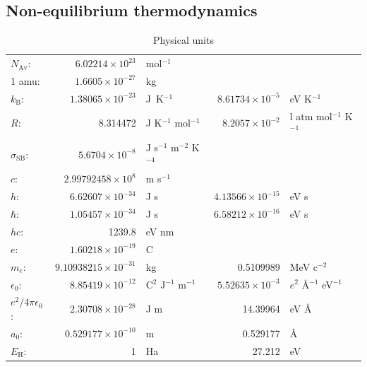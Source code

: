 \documentclass[11pt]{article}
\begin{document}
\subsection{Non-equilibrium thermodynamics}
\label{sec:org2658aed}
\begin{table}
\begin{center}
\caption{Physical units}
\begin{tabular}{|lrlrl|}
  \hline
  $N_\mathrm{Av}$: & $6.02214 \times 10^{23}$& mol$^{-1}$  & & \\
  1 amu: & $1.6605\times 10^{-27}$ & kg & & \\
  $k_\mathrm{B}$: & $1.38065\times 10^{-23}$ & J~K$^{-1}$ & $8.61734\times
  10^{-5}$ & eV K$^{-1}$\\
  $R$: & 8.314472 & J K$^{-1}$ mol$^{-1}$ & $8.2057 \times 10^{-2}$ & l atm mol$^{-1}$ K$^{-1}$\\
  $\sigma_\mathrm{SB}$: & $5.6704\times 10^{-8}$ & J s$^{-1}$ m$^{-2}$ K$^{-4}$ & & \\
  $c$: & $2.99792458\times 10^8$ & m s$^{-1}$ & & \\
  $h$: & $6.62607\times 10^{-34}$ & J s & $4.13566\times 10^{-15}$ & eV s
  \\
  $\hbar$: & $1.05457\times 10^{-34}$ & J s & $6.58212\times 10^{-16}$&  eV s \\
  $hc$: & 1239.8 & eV nm  & & \\
  $e$: & $1.60218\times 10^{-19}$ &  C & & \\
  $m_e:$ & $9.10938215\times 10^{-31}$ & kg &0.5109989 & MeV c$^{-2}$  \\
  $\epsilon_0$: & $8.85419 \times 10^{-12}$ & C$^2$ J$^{-1}$ m$^{-1}$ & $5.52635\times
  10^{-3}$ & $e^2$ \AA$^{-1}$ eV$^{-1}$ \\
  $e^2/4\pi\epsilon_0$: & $2.30708 \times 10^{-28}$&  J m & 14.39964 & eV \AA\\
  $a_0$: & $0.529177 \times 10^{-10}$ & m & 0.529177 & \AA\\
  $E_\mathrm{H} $: & 1 & Ha & 27.212 & eV \\
  \hline
\end{tabular}
\end{center}
\end{table}
\end{document}
